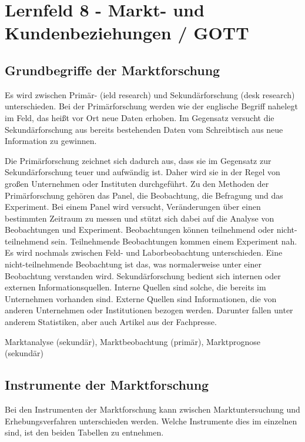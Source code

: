 \section{Lernfeld 8 - Markt- und Kundenbeziehungen / GOTT} %

\subsection{Grundbegriffe der Marktforschung}
Es wird zwischen Primär- (ield research) und Sekundärforschung (desk research) unterschieden. Bei der Primärforschung werden wie der englische Begriff nahelegt im Feld, das heißt vor Ort neue Daten erhoben. Im Gegensatz versucht die Sekundärforschung aus bereits bestehenden Daten vom Schreibtisch aus neue Information zu gewinnen.

\noindent Die Primärforschung zeichnet sich dadurch aus, dass sie im Gegensatz zur Sekundärforschung teuer und aufwändig ist. Daher wird sie in der Regel von großen Unternehmen oder Instituten durchgeführt. Zu den Methoden der Primärforschung gehören das Panel, die Beobachtung, die Befragung und das Experiment. Bei einem Panel wird versucht, Veränderungen über einen bestimmten Zeitraum zu messen und stützt sich dabei auf die Analyse von Beobachtungen und Experiment. Beobachtungen können teilnehmend oder nicht-teilnehmend sein. Teilnehmende Beobachtungen kommen einem Experiment nah. Es wird nochmals zwischen Feld- und Laborbeobachtung unterschieden. Eine nicht-teilnehmende Beobachtung ist das, was normalerweise unter einer Beobachtung verstanden wird. Sekundärforschung bedient sich internen oder externen Informationsquellen. Interne Quellen sind solche, die bereits im Unternehmen vorhanden sind. Externe Quellen sind Informationen, die von anderen Unternehmen oder Institutionen bezogen werden. Darunter fallen unter anderem Statistiken, aber auch Artikel aus der Fachpresse.

Marktanalyse (sekundär), Marktbeobachtung (primär), Marktprognose (sekundär)

\subsection{Instrumente der Marktforschung}

Bei den Instrumenten der Marktforschung kann zwischen Marktuntersuchung und Erhebungsverfahren unterschieden werden. Welche Instrumente dies im einzelnen sind, ist den beiden Tabellen zu entnehmen.

